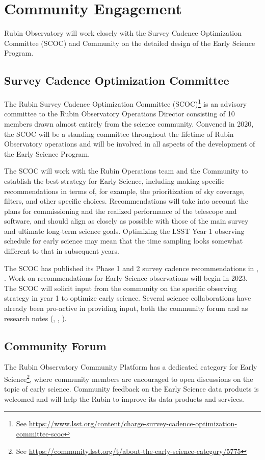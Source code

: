 \section{Community Engagement}

Rubin Observatory will work closely with the Survey Cadence Optimization Committee (SCOC) and Community on the detailed design of the Early Science Program. 

\subsection{Survey Cadence Optimization Committee}
The Rubin Survey Cadence Optimization Committee (SCOC)\footnote{See \url{https://www.lsst.org/content/charge-survey-cadence-optimization-committee-scoc}} is an advisory committee to the Rubin Observatory Operations Director consisting of 10 members drawn almost entirely from the science community.
Convened in 2020, the SCOC will be a standing committee throughout the lifetime of Rubin Observatory operations and will be involved in all aspects of the development of the Early Science Program. 

The SCOC will work with the Rubin Operations team and the Community to establish the best strategy for Early Science, including making specific recommendations in terms of, for example, the prioritization of sky coverage, filters, and other specific choices. 
Recommendations will take into account the plans for commissioning and the realized performance of the telescope and software, and should align as closely as possible with those of the main survey and ultimate long-term science goals. 
Optimizing the LSST Year 1 observing schedule for early science may mean that the time sampling looks somewhat different to that in subsequent years. 

The SCOC has published its Phase 1 and 2 survey cadence recommendations in \cite{PSTN-053}, \cite{PSTN-055}. 
Work on recommendations for Early Science observations will begin in 2023.
The SCOC will solicit input from the community on the specific observing strategy in year 1 to optimize early science. 
Several science collaborations have already been pro-active in providing input,  both the community forum and as research notes (\citep{2020arXiv201005926L}, \citep{Hambleton_2020}, \citep{Street_2020}).


\subsection{Community Forum}

The Rubin Observatory Community Platform has a dedicated category for Early Science\footnote{See \url{https://community.lsst.org/t/about-the-early-science-category/5775}}, where community members are encouraged to open discussions on the topic of early science. 
Community feedback on the Early Science data products is welcomed and will help the Rubin to improve its data products and services. 
